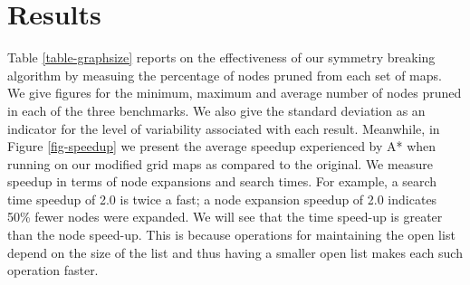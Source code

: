 \section{Results}
\label{sec-results}
Table \ref{table-graphsize} reports on the effectiveness of our symmetry breaking
algorithm by measuing the percentage of nodes pruned from each set of maps.
We give figures for the minimum, maximum and average number of nodes pruned
in each of the three benchmarks.
We also give the standard deviation as an indicator for the level of variability
associated with each result.
Meanwhile, in Figure \ref{fig-speedup} we present the average speedup experienced by A* 
when running on our modified grid maps as compared to the original.
We measure speedup in terms of node expansions and search times.
For example, a search time speedup of 2.0 is twice a fast; a node expansion speedup of 2.0 
indicates 50\% fewer nodes were expanded.
We will see that the time speed-up is greater than the node speed-up.
This is because operations for maintaining the open list depend on the size of the list
and thus having a smaller open list makes each such operation faster.

